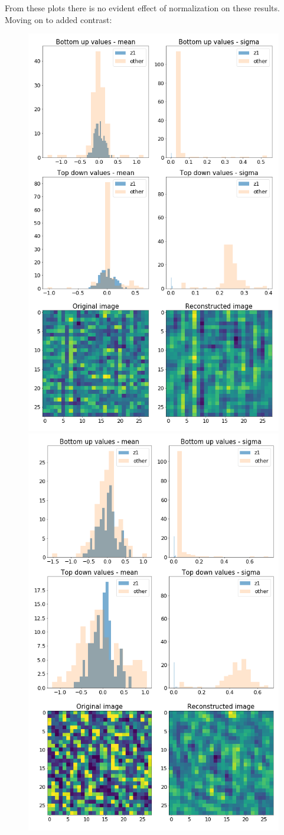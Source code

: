 \documentclass[12pt, english]{article}
\begin{document}
\vspace{4mm}

\par From these plots there is no evident effect of normalization on these results. Moving on to added contrast:

\vspace{4mm}

\begin{figure}[H]
  \begin{minipage}{0.5\linewidth}
    \centering
    \includegraphics[width=.6\linewidth]{z1_vis/z1_vis_contrast_no_norm/15_DenseLinLinLadderVAE_textures_noContrastNorm_contrast-stats-1_TD_BU_COMPS_1.png}
  \end{minipage}
  \begin{minipage}{0.5\linewidth}
    \centering
    \includegraphics[width=.6\linewidth]{z1_vis/z1_vis_contrast_no_norm/15_DenseLinLinLadderVAE_textures_noContrastNorm_contrast-stats-2_TD_BU_COMPS_1.png} 

\end{minipage}
\end{figure}
\end{document}
